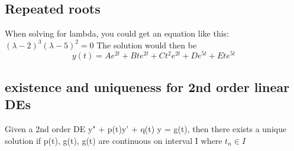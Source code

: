 \documentclass[17pt]{extarticle} %
\begin{document}
\subsection{Repeated roots}

When solving for lambda, you could get an equation like this:
$(\lambda - 2)^3 (\lambda-5)^2 = 0$
The solution would then be
$$
y(t) = A e^{2t} + B t e^{2t} + C t^2 e^{2t} + D e^{5t} + E t e^{5t}
$$

\subsection{existence and uniqueness for 2nd order linear DEs}
Given a 2nd order DE y" + p(t)y' + q(t) y = g(t), then there exists a unique solution if 
p(t), g(t), g(t) are continuous on interval I where $t_n \in I$ 
\end{document}
